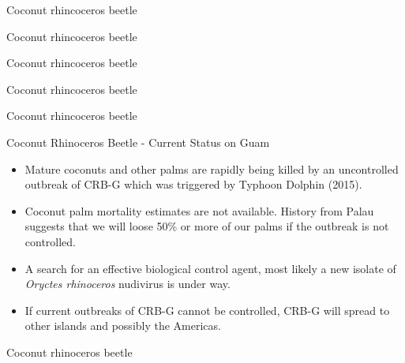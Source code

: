 \documentclass[]{beamer}
\begin{document}
\begin{frame}{Coconut rhincoceros beetle}
\end{frame}

\begin{frame}{Coconut rhincoceros beetle}
\end{frame}

\begin{frame}{Coconut rhincoceros beetle}
\end{frame}

\begin{frame}{Coconut rhincoceros beetle}
\end{frame}

\begin{frame}{Coconut rhincoceros beetle}
\end{frame}

\begin{frame}{Coconut Rhinoceros Beetle - Current Status on Guam}
	\begin{itemize}
		\item Mature coconuts and other palms are rapidly being killed by an uncontrolled outbreak of CRB-G which was triggered by Typhoon Dolphin (2015).
		\item Coconut palm mortality estimates are not available. History from Palau suggests that we will loose 50\% or more of our palms if the outbreak is not controlled.
		\item A search for an effective biological control agent, most likely a new isolate of \textit{Oryctes rhinoceros} nudivirus is under way.
		\item If current outbreaks of CRB-G cannot be controlled, CRB-G will spread to other islands and possibly the Americas.
	\end{itemize}
\end{frame}

\begin{frame}{Coconut rhinoceros beetle}
\end{frame}
\end{document}
